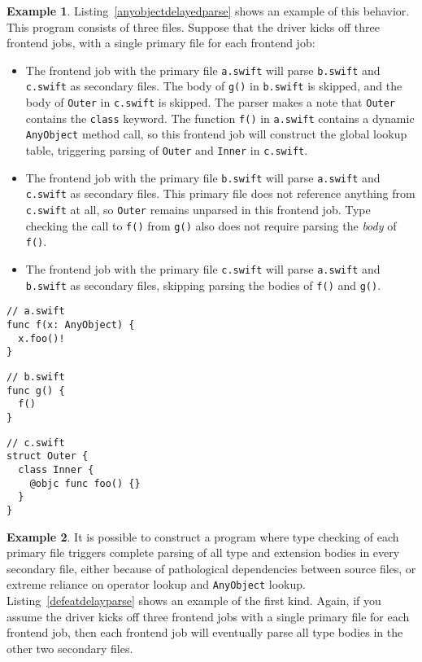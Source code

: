 \documentclass[a4paper,headsepline,bibliography=totoc,toc=flat,fleqn,twoside=semi]{scrbook}
\theoremstyle{definition}
\theoremstyle{definition}
\newtheorem{example}{Example}[chapter]
\theoremstyle{definition}
\begin{document}
\begin{example}\label{anyobjectdelayedparseex}
Listing~\ref{anyobjectdelayedparse} shows an example of this behavior. This program consists of three files. Suppose that the driver kicks off three frontend jobs, with a single primary file for each frontend job:
\begin{itemize}
\item The frontend job with the primary file \texttt{a.swift} will parse \texttt{b.swift} and \texttt{c.swift} as secondary files. The body of \texttt{g()} in \texttt{b.swift} is skipped, and the body of \texttt{Outer} in \texttt{c.swift} is skipped. The parser makes a note that \texttt{Outer} contains the \texttt{class} keyword. The function \texttt{f()} in \texttt{a.swift} contains a dynamic \texttt{AnyObject} method call, so this frontend job will construct the global lookup table, triggering parsing of \texttt{Outer} and \texttt{Inner} in \texttt{c.swift}.
\item The frontend job with the primary file \texttt{b.swift} will parse \texttt{a.swift} and \texttt{c.swift} as secondary files. This primary file does not reference anything from \texttt{c.swift} at all, so \texttt{Outer} remains unparsed in this frontend job. Type checking the call to \texttt{f()} from \texttt{g()} also does not require parsing the \emph{body} of \texttt{f()}.
\item The frontend job with the primary file \texttt{c.swift} will parse \texttt{a.swift} and \texttt{b.swift} as secondary files, skipping parsing the bodies of \texttt{f()} and \texttt{g()}.
\end{itemize}
\end{example}

\begin{listing}\label{anyobjectdelayedparse}
\begin{Verbatim}
// a.swift
func f(x: AnyObject) {
  x.foo()!
}
\end{Verbatim}

\begin{Verbatim}
// b.swift
func g() {
  f()
}
\end{Verbatim}

\begin{Verbatim}
// c.swift
struct Outer {
  class Inner {
    @objc func foo() {}
  }
}
\end{Verbatim}
\end{listing}

\begin{example}
It is possible to construct a program where type checking of each primary file triggers complete parsing of all type and extension bodies in every secondary file, either because of pathological dependencies between source files, or extreme reliance on operator lookup and \texttt{AnyObject} lookup. Listing~\ref{defeatdelayparse} shows an example of the first kind. Again, if you assume the driver kicks off three frontend jobs with a single primary file for each frontend job, then each frontend job will eventually parse all type bodies in the other two secondary files.
\end{example}
\end{document}
